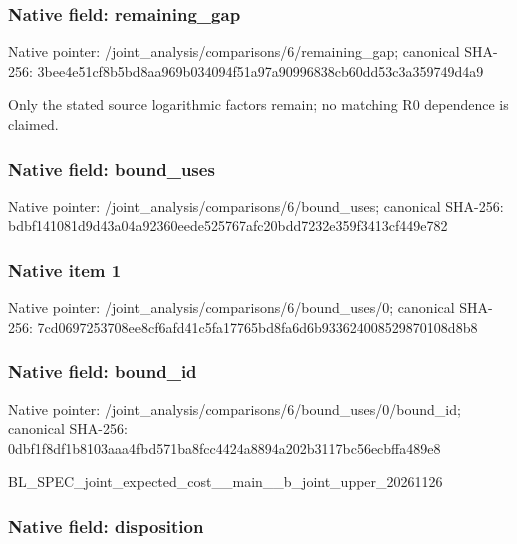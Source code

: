\documentclass[10pt,a4paper]{article}
\begin{document}
\subsubsection{Native field: remaining\_gap}


Native pointer: /joint\_analysis/comparis\allowbreak{}ons/6/remaining\_gap; canonical SHA-256: 3bee4e51cf8b5bd8aa969b03\allowbreak{}4094f51a97a90996838cb60d\allowbreak{}d53c3a359749d4a9


Only the stated source logarithmic factors remain; no matching R0 dependence is claimed.


\subsubsection{Native field: bound\_uses}


Native pointer: /joint\_analysis/comparis\allowbreak{}ons/6/bound\_uses; canonical SHA-256: bdbf141081d9d43a04a92360\allowbreak{}eede525767afc20bdd7232e3\allowbreak{}59f3413cf449e782



\subsubsection{Native item 1}


Native pointer: /joint\_analysis/comparis\allowbreak{}ons/6/bound\_uses/0; canonical SHA-256: 7cd0697253708ee8cf6afd41\allowbreak{}c5fa17765bd8fa6d6b933624\allowbreak{}008529870108d8b8



\subsubsection{Native field: bound\_id}


Native pointer: /joint\_analysis/comparis\allowbreak{}ons/6/bound\_uses/0/bound\allowbreak{}\_id; canonical SHA-256: 0dbf1f8df1b8103aaa4fbd57\allowbreak{}1ba8fcc4424a8894a202b311\allowbreak{}7bc56ecbffa489e8


BL\_SPEC\_joint\_expected\_c\allowbreak{}ost\_\_main\_\_b\_joint\_upper\allowbreak{}\_20261126


\subsubsection{Native field: disposition}
\end{document}
